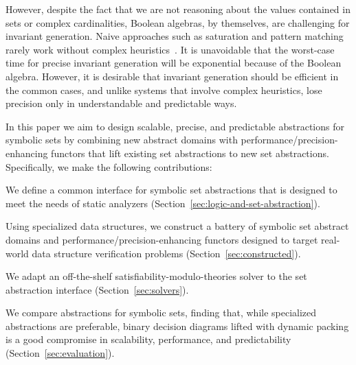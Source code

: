 However, despite the fact that we are not reasoning about the values
contained in sets or complex cardinalities, Boolean algebras, by
themselves, are challenging for invariant generation.
Naive approaches such as saturation and pattern matching rarely work
without complex heuristics~\cite{fixbag:cav:11,ab:ecoop:13}.
It is unavoidable that the worst-case time for precise invariant
generation will be exponential because of the Boolean algebra.
However, it is desirable that invariant generation should be efficient
in the common cases, and unlike systems that involve complex heuristics,
lose precision only in understandable and predictable ways.

In this paper we aim to design scalable, precise, and predictable abstractions for symbolic sets by combining new abstract domains with performance/precision-enhancing functors that lift existing set abstractions to new set abstractions.  Specifically, we make the following contributions:
%
\begin{compactitem}
\item We define a common interface for symbolic set abstractions that is designed to meet the needs of static analyzers (Section~\ref{sec:logic-and-set-abstraction}).
%
\item Using specialized data structures, we construct a battery of symbolic set abstract domains and performance/precision-enhancing functors designed to target real-world data structure verification problems (Section~\ref{sec:constructed}).
%
\item We adapt an off-the-shelf satisfiability-modulo-theories solver to the set abstraction interface (Section~\ref{sec:solvers}).
%
\item We compare abstractions for symbolic sets, finding that, while specialized abstractions are preferable, binary decision diagrams lifted with dynamic packing is a good compromise in scalability, performance, and predictability (Section~\ref{sec:evaluation}).
%
\end{compactitem}